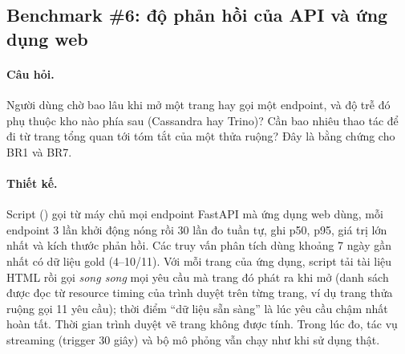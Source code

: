 \subsection{Benchmark \#6: độ phản hồi của API và ứng dụng web}
\label{sec:5-bench-web}

\paragraph{Câu hỏi.} Người dùng chờ bao lâu khi mở một trang hay gọi một endpoint, và độ trễ đó phụ thuộc kho nào phía sau (Cassandra hay Trino)? Cần bao nhiêu thao tác để đi từ trang tổng quan tới tóm tắt của một thửa ruộng? Đây là bằng chứng cho BR1 và BR7.

\paragraph{Thiết kế.} Script  () gọi từ máy chủ mọi endpoint FastAPI mà ứng dụng web dùng, mỗi endpoint 3 lần khởi động nóng rồi 30 lần đo tuần tự, ghi p50, p95, giá trị lớn nhất và kích thước phản hồi. Các truy vấn phân tích dùng khoảng 7 ngày gần nhất có dữ liệu gold (4--10/11). Với mỗi trang của ứng dụng, script tải tài liệu HTML rồi gọi \emph{song song} mọi yêu cầu  mà trang đó phát ra khi mở (danh sách được đọc từ resource timing của trình duyệt trên từng trang, ví dụ trang thửa ruộng gọi 11 yêu cầu); thời điểm ``dữ liệu sẵn sàng'' là lúc yêu cầu chậm nhất hoàn tất. Thời gian trình duyệt vẽ trang không được tính. Trong lúc đo, tác vụ streaming (trigger 30 giây) và bộ mô phỏng vẫn chạy như khi sử dụng thật.

